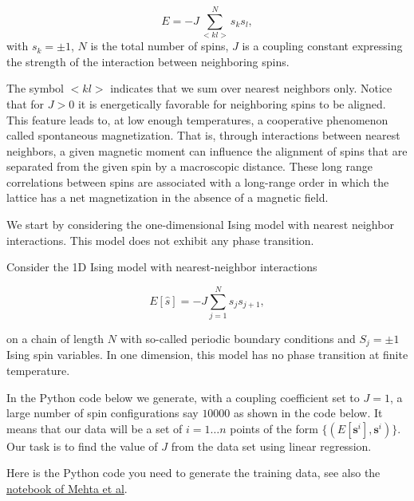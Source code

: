 \documentclass[%
oneside,                 %
final,                   %
10pt]{article}
\begin{document}
\begin{equation*}
  E=-J\sum_{<kl>}^{N}s_ks_l,
\end{equation*}
with  $s_k=\pm 1$, $N$ is the total number of spins,
$J$ is a coupling constant expressing the strength of the interaction
between neighboring spins.

The symbol $<kl>$ indicates that we sum over nearest
neighbors only.
Notice that for $J>0$ it is energetically favorable for neighboring spins
to be aligned. This feature leads to, at low enough temperatures,
a cooperative phenomenon called spontaneous magnetization. That is,
through interactions between nearest neighbors, a given magnetic
moment can influence the alignment of spins  that are separated
from the given spin by a macroscopic distance. These long range correlations
between spins are associated with a long-range order in which
the lattice has a net magnetization in the absence of a magnetic field.



We start by considering the one-dimensional Ising model with nearest neighbor interactions. This model does not exhibit any phase transition.

Consider the 1D Ising model with nearest-neighbor interactions 

\begin{equation*}
  E[\hat{s}]=-J\sum_{j=1}^{N}s_{j}s_{j+1},
\end{equation*}

on a chain of length $N$ with so-called periodic boundary conditions and $S_j=\pm 1$ Ising spin variables.
In one dimension, this model has no phase transition at finite temperature.

In the Python code below we generate, with a coupling coefficient set to $J=1$, a large number of spin configurations say $10000$ as shown in the code below.
It means that our data will be a set of $i=1\ldots n$ points of the form
$\{(E[\boldsymbol{s}^i],\boldsymbol{s}^i)\}$.
Our task is to find the value of $J$ from the data set using linear regression.

Here is the Python code you need to generate the training data, see
also the \href{{https://physics.bu.edu/~pankajm/ML-Notebooks/HTML/NB_CVI-linreg_ising.html}}{notebook of Mehta et
al}.
\end{document}
